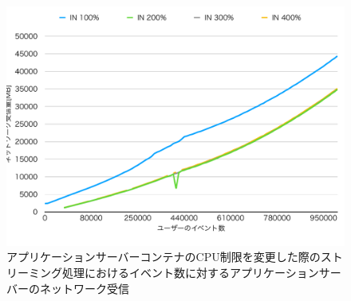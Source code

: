 \documentclass[../../../../../main]{subfiles}
\begin{document}
    \begin{figure}[H]
        \centering
        \includegraphics[width=12cm]{graph}
        \caption{アプリケーションサーバーコンテナのCPU制限を変更した際のストリーミング処理におけるイベント数に対するアプリケーションサーバーのネットワーク受信}
        \label{fig:stream-change-cpu-limit-app-net-in-app_1024-db_1_1024}
    \end{figure}
\end{document}
